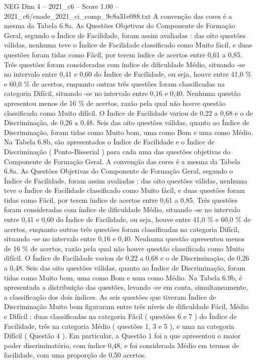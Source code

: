 \begin{textsample}{NEG Dim 4 – 2021\_c6 – Score 1.00 – 2021\_c6/enade\_2021\_ci\_comp\_9c8a31e088.txt}
A convenção das cores é a mesma da Tabela 6.8a.
As Questões Objetivas do Componente de Formação Geral, segundo o Índice de Facilidade, foram assim avaliadas : das oito questões válidas, nenhuma teve o Índice de Facilidade classificado como Muito fácil, e duas questões foram tidas como Fácil, por terem índice de acertos entre 0,61 a 0,85.
Três questões foram consideradas com índice de dificuldade Médio, situando -se no intervalo entre 0,41 e 0,60 do Índice de Facilidade, ou seja, houve entre 41,0 \% e 60,0 \% de acertos, enquanto outras três questões foram classificadas na categoria Difícil, situando -se no intervalo entre 0,16 e 0,40.
Nenhuma questão apresentou menos de 16 \% de acertos, razão pela qual não houve questão classificada como Muito difícil.
O Índice de Facilidade variou de 0,22 a 0,68 e o de Discriminação, de 0,26 a 0,48.
Seis das oito questões válidas, quanto ao Índice de Discriminação, foram tidas como Muito bom, uma como Bom e uma como Médio.
Na Tabela 6.8b, são apresentados o Índice de Facilidade e o Índice de Discriminação ( Ponto-Bisserial ) para cada uma das questões objetivas do Componente de Formação Geral.
A convenção das cores é a mesma da Tabela 6.8a.
As Questões Objetivas do Componente de Formação Geral, segundo o Índice de Facilidade, foram assim avaliadas : das oito questões válidas, nenhuma teve o Índice de Facilidade classificado como Muito fácil, e duas questões foram tidas como Fácil, por terem índice de acertos entre 0,61 a 0,85.
Três questões foram consideradas com índice de dificuldade Médio, situando -se no intervalo entre 0,41 e 0,60 do Índice de Facilidade, ou seja, houve entre 41,0 \% e 60,0 \% de acertos, enquanto outras três questões foram classificadas na categoria Difícil, situando -se no intervalo entre 0,16 e 0,40.
Nenhuma questão apresentou menos de 16 \% de acertos, razão pela qual não houve questão classificada como Muito difícil.
O Índice de Facilidade variou de 0,22 a 0,68 e o de Discriminação, de 0,26 a 0,48.
Seis das oito questões válidas, quanto ao Índice de Discriminação, foram tidas como Muito bom, uma como Bom e uma como Médio.
Na Tabela 6.9b, é apresentada a distribuição das questões, levando -se em conta, simultaneamente, a classificação dos dois índices.
As seis questões que tiveram Índice de Discriminação Muito bom figuraram entre três níveis de dificuldade Fácil, Médio e Difícil : duas classificadas na categoria Fácil ( questões 6 e 7 ) do Índice de Facilidade, três na categoria Médio ( questões 1, 3 e 5 ), e uma na categoria Difícil ( Questão 4 ).
Em particular, a Questão 1 foi a que apresentou o maior poder discriminatório, com índice 0,48, e foi considerada Médio em termos de facilidade, com uma proporção de 0,50 acertos.

\end{textsample}
